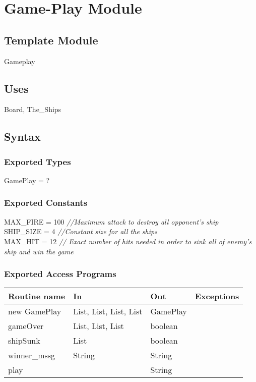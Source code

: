 \documentclass[12pt]{article}
\begin{document}
\newpage

\section* {Game-Play Module}

\subsection* {Template Module}

Gameplay

\subsection* {Uses}

Board, The\_Ships

\subsection* {Syntax}

\subsubsection* {Exported Types}

GamePlay = ?

\subsubsection* {Exported Constants}

MAX\_FIRE = 100 {\it //Maximum attack to destroy all opponent's ship}\\
SHIP\_SIZE = 4  {\it //Constant size for all the ships }\\
MAX\_HIT = 12 {\it // Exact number of hits needed in order to sink all of enemy's ship and win the game}

\subsubsection* {Exported Access Programs}

\begin{tabular}{| l | l | l | l |}
\hline
\textbf{Routine name} & \textbf{In} & \textbf{Out} & \textbf{Exceptions}\\
\hline
new GamePlay & List, List, List, List & GamePlay & ~\\
\hline
gameOver& List, List, List & boolean & ~\\
\hline 
shipSunk& List & boolean & ~\\
\hline
winner\_mssg& String & String & ~\\
\hline
play& ~ & String & ~\\
\hline
\end{tabular}
\end{document}
